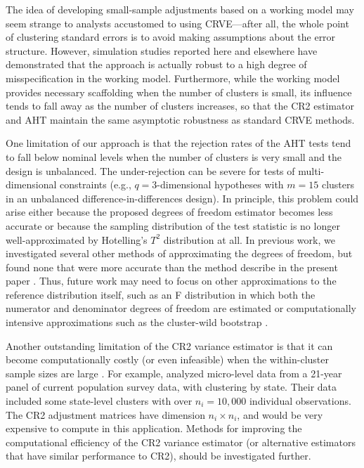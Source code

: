 \documentclass[12pt]{article}\usepackage[]{graphicx}\usepackage[]{color}
\begin{document}
The idea of developing small-sample adjustments based on a working model may seem strange to analysts accustomed to using CRVE---after all, the whole point of clustering standard errors is to avoid making assumptions about the error structure.
However, simulation studies reported here and elsewhere  have demonstrated that the approach is actually robust to a high degree of misspecification in the working model. 
Furthermore, while the working model provides necessary scaffolding when the number of clusters is small, its  influence tends to fall away as the number of clusters increases, so that the CR2 estimator and AHT maintain the same asymptotic robustness as standard CRVE methods. 

One limitation of our approach is that the rejection rates of the AHT tests tend to fall below nominal levels when the number of clusters is very small and the design is unbalanced. 
The under-rejection can be severe for tests of multi-dimensional constraints (e.g., $q = 3$-dimensional hypotheses with $m = 15$ clusters in an unbalanced difference-in-differences design). 
In principle, this problem could arise either because the proposed degrees of freedom estimator becomes less accurate or because the sampling distribution of the test statistic is no longer well-approximated by Hotelling's $T^2$ distribution at all. 
In previous work, we investigated several other methods of approximating the degrees of freedom, but found none that were more accurate than the method describe in the present paper \citep{Tipton2015small-F}. 
Thus, future work may need to focus on other approximations to the reference distribution itself, such as an F distribution in which both the numerator and denominator degrees of freedom are estimated \citep[cf.][]{Mehrotra1997improving} or computationally intensive approximations such as the cluster-wild bootstrap \citep{MacKinnon2016wild}.   

Another outstanding limitation of the CR2 variance estimator is that it can become computationally costly (or even infeasible) when the within-cluster sample sizes are large \citep{Mackinnon2015wildCIs}. 
For example, \citet{Bertrand2004how} analyzed micro-level data from a 21-year panel of current population survey data, with clustering by state. Their data included some state-level clusters with over $n_i = 10,000$ individual observations. 
The CR2 adjustment matrices have dimension $n_i \times n_i$, and would be very expensive to compute in this application. 
Methods for improving the computational efficiency of the CR2 variance estimator (or alternative estimators that have similar performance to CR2), should be investigated further. 
\end{document}
